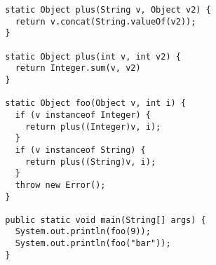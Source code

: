 {\tiny \begin{verbatim}
  static Object plus(String v, Object v2) {
    return v.concat(String.valueOf(v2));
  }

  static Object plus(int v, int v2) {
    return Integer.sum(v, v2)
  }

  static Object foo(Object v, int i) {
    if (v instanceof Integer) {
      return plus((Integer)v, i);
    }
    if (v instanceof String) {
      return plus((String)v, i);
    }
    throw new Error();
  }

  public static void main(String[] args) {
    System.out.println(foo(9));
    System.out.println(foo("bar"));
  }
\end{verbatim} }
